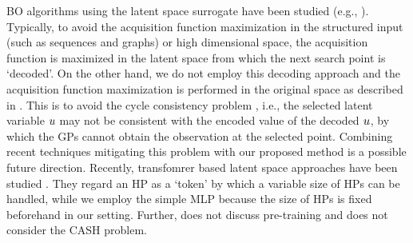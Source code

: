 

BO algorithms using the latent space surrogate have been studied (e.g., \cite{gomez2018automatic}). 
%
Typically, to avoid the acquisition function maximization in the structured input (such as sequences and graphs) or high dimensional space, the acquisition function is maximized in the latent space from which the next search point is `decoded'. 
%
On the other hand, we do not employ this decoding approach and the acquisition function maximization is performed in the original space as described in .
%
This is to avoid the cycle consistency problem \cite{jha2018disentangling}, i.e., the selected latent variable $\*u$ may not be consistent with the encoded value of the decoded $\*u$, by which the GPs cannot obtain the observation at the selected point.
%
Combining recent techniques mitigating this problem \cite{boyar2024latent} with our proposed method is a possible future direction.
%
Recently, transfomrer based latent space approaches have been studied \cite{lyu2023efficient,li2024an}.
%
They regard an HP as a `token' by which a variable size of HPs can be handled, while we employ the simple MLP because the size of HPs is fixed beforehand in our setting.
%
Further, \cite{li2024an} does not discuss pre-training and \cite{lyu2023efficient} does not consider the CASH problem. 





%